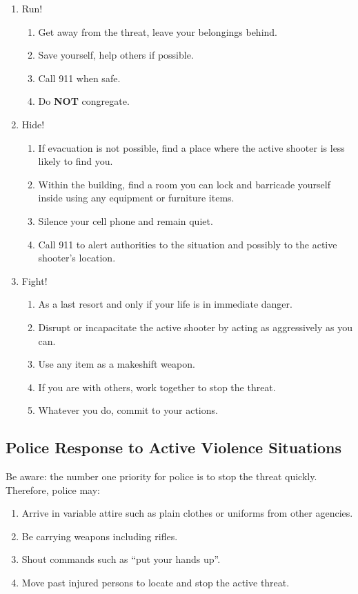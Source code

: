 \documentclass[11pt]{article}
\begin{document}
\begin{enumerate}
	\item Run!
	\begin{enumerate}
        \item Get away from the threat, leave your belongings behind.
        \item Save yourself, help others if possible.
        \item Call 911 when safe.
        \item Do \textbf{NOT} congregate.
    \end{enumerate}
	\item Hide!
	\begin{enumerate}
        \item If evacuation is not possible, find a place where the active shooter is less likely to find you.
        \item Within the building, find a room you can lock and barricade yourself inside using any equipment or furniture items.
        \item Silence your cell phone and remain quiet.
        \item Call 911 to alert authorities to the situation and possibly to the active shooter's location.
    \end{enumerate}
    \item Fight!
	\begin{enumerate}
        \item As a last resort and only if your life is in immediate danger.
        \item Disrupt or incapacitate the active shooter by acting as aggressively as you can.
        \item Use any item as a makeshift weapon.
        \item If you are with others, work together to stop the threat.
        \item Whatever you do, commit to your actions.
    \end{enumerate}
\end{enumerate}


\subsection{Police Response to Active Violence Situations}
\label{ssec:police}

Be aware: the number one priority for police is to stop the threat quickly. Therefore, police may:

\begin{enumerate}
	\item Arrive in variable attire such as plain clothes or uniforms from other agencies.
	\item Be carrying weapons including rifles.
	\item Shout commands such as ``put your hands up''.
	\item Move past injured persons to locate and stop the active threat.
\end{enumerate}
\end{document}
